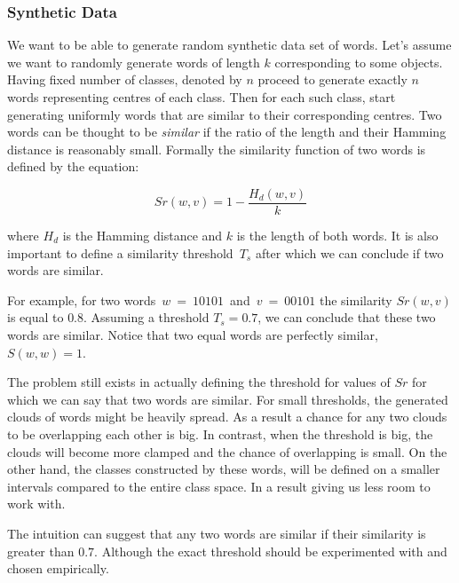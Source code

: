 \documentclass{article}
\begin{document}
\subsubsection{Synthetic Data} \label{section:word_gen_synth}
We want to be able to generate random synthetic data set of words.
Let's assume we want to randomly generate words of length $k$ corresponding to some objects. Having fixed number of classes, denoted by $n$ proceed to generate exactly $n$ words representing centres of each class. Then for each such class, start generating uniformly words that are similar to their corresponding centres. Two words can be thought to be \textit{similar} if the ratio of the length and their Hamming distance is reasonably small. Formally the similarity function of two words is defined by the equation:

\begin{equation}
	Sr(w,v) = 1 - \frac{H_d(w,v)}{k}
\end{equation}

where $H_d$ is the Hamming distance and $k$ is the length of both words. It is also important to define a similarity threshold~$T_s$ after which we can conclude if two words are similar.

For example, for two words~$w~=~10101$~and~$v~=~00101$ the similarity $Sr(w, v)$ is equal to $0.8$. Assuming a threshold $T_s = 0.7$, we can conclude that these two words are similar. Notice that two equal words are perfectly similar, $S(w,w) = 1$.

The problem still exists in actually defining the threshold for values of $Sr$ for which we can say that two words are similar. For small thresholds, the generated clouds of words might be heavily spread. As a result a chance for any two clouds to be overlapping each other is big. In contrast, when the threshold is big, the clouds will become more clamped and the chance of overlapping is small. On the other hand, the classes constructed by these words, will be defined on a smaller intervals compared to the entire class space. In a result giving us less room to work with.

The intuition can suggest that any two words are similar if their similarity is greater than $0.7$. Although the exact threshold should be experimented with and chosen empirically.

\end{document}
